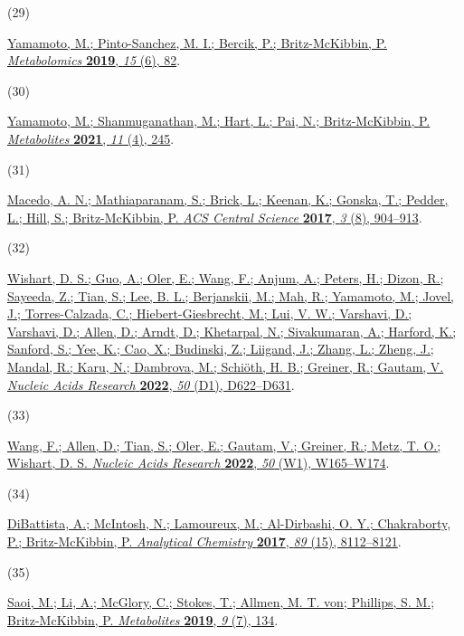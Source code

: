 \documentclass[journal=jacsat,manuscript=article]{achemso}
\newlength{\cslhangindent}
\newlength{\csllabelwidth}
\newenvironment{CSLReferences}[2] %
 {\begin{list}{}{%
  \setlength{\itemindent}{0pt}
  \setlength{\leftmargin}{0pt}
  \setlength{\parsep}{0pt}
  \ifodd #1
   \setlength{\leftmargin}{\cslhangindent}
   \setlength{\itemindent}{-1\cslhangindent}
  \fi
  \setlength{\itemsep}{#2\baselineskip}}}
 {\end{list}}
\newcommand{\CSLLeftMargin}[1]{\parbox[t]{\csllabelwidth}{#1}}
\newcommand{\CSLRightInline}[1]{\parbox[t]{\linewidth - \csllabelwidth}{#1}\break}
\begin{document}
\begin{CSLReferences}{0}{0}
\CSLLeftMargin{(29) }%
\CSLRightInline{\href{https://doi.org/10.1007/s11306-019-1543-0}{Yamamoto,
M.; Pinto-Sanchez, M. I.; Bercik, P.; Britz-McKibbin, P.
\emph{Metabolomics} \textbf{2019}, \emph{15} (6), 82}.}

\CSLLeftMargin{(30) }%
\CSLRightInline{\href{https://doi.org/10.3390/metabo11040245}{Yamamoto,
M.; Shanmuganathan, M.; Hart, L.; Pai, N.; Britz-McKibbin, P.
\emph{Metabolites} \textbf{2021}, \emph{11} (4), 245}.}

\CSLLeftMargin{(31) }%
\CSLRightInline{\href{https://doi.org/10.1021/acscentsci.7b00299}{Macedo,
A. N.; Mathiaparanam, S.; Brick, L.; Keenan, K.; Gonska, T.; Pedder, L.;
Hill, S.; Britz-McKibbin, P. \emph{ACS Central Science} \textbf{2017},
\emph{3} (8), 904--913}.}

\CSLLeftMargin{(32) }%
\CSLRightInline{\href{https://doi.org/10.1093/nar/gkab1062}{Wishart, D.
S.; Guo, A.; Oler, E.; Wang, F.; Anjum, A.; Peters, H.; Dizon, R.;
Sayeeda, Z.; Tian, S.; Lee, B. L.; Berjanskii, M.; Mah, R.; Yamamoto,
M.; Jovel, J.; Torres-Calzada, C.; Hiebert-Giesbrecht, M.; Lui, V. W.;
Varshavi, D.; Varshavi, D.; Allen, D.; Arndt, D.; Khetarpal, N.;
Sivakumaran, A.; Harford, K.; Sanford, S.; Yee, K.; Cao, X.; Budinski,
Z.; Liigand, J.; Zhang, L.; Zheng, J.; Mandal, R.; Karu, N.; Dambrova,
M.; Schiöth, H. B.; Greiner, R.; Gautam, V. \emph{Nucleic Acids
Research} \textbf{2022}, \emph{50} (D1), D622--D631}.}

\CSLLeftMargin{(33) }%
\CSLRightInline{\href{https://doi.org/10.1093/nar/gkac383}{Wang, F.;
Allen, D.; Tian, S.; Oler, E.; Gautam, V.; Greiner, R.; Metz, T. O.;
Wishart, D. S. \emph{Nucleic Acids Research} \textbf{2022}, \emph{50}
(W1), W165--W174}.}

\CSLLeftMargin{(34) }%
\CSLRightInline{\href{https://doi.org/10.1021/acs.analchem.7b01727}{DiBattista,
A.; McIntosh, N.; Lamoureux, M.; Al-Dirbashi, O. Y.; Chakraborty, P.;
Britz-McKibbin, P. \emph{Analytical Chemistry} \textbf{2017}, \emph{89}
(15), 8112--8121}.}

\CSLLeftMargin{(35) }%
\CSLRightInline{\href{https://doi.org/10.3390/metabo9070134}{Saoi, M.;
Li, A.; McGlory, C.; Stokes, T.; Allmen, M. T. von; Phillips, S. M.;
Britz-McKibbin, P. \emph{Metabolites} \textbf{2019}, \emph{9} (7),
134}.}


\end{CSLReferences}
\end{document}
